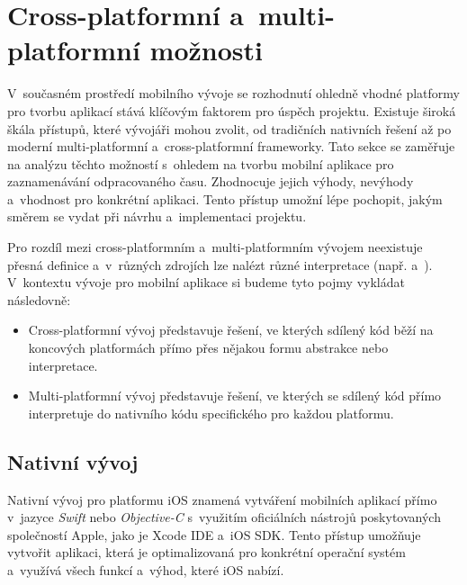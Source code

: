 \section{Cross-platformní a~multi-platformní možnosti}\label{crossplatform-multiplatform}

V~současném prostředí mobilního vývoje se rozhodnutí ohledně vhodné platformy pro tvorbu aplikací stává klíčovým faktorem pro úspěch projektu. Existuje široká škála přístupů, které vývojáři mohou zvolit, od tradičních nativních řešení až po moderní multi-platformní a~cross-platformní frameworky. Tato sekce se zaměřuje na analýzu těchto možností s~ohledem na tvorbu mobilní aplikace pro zaznamenávání odpracovaného času. Zhodnocuje jejich výhody, nevýhody a~vhodnost pro konkrétní aplikaci. Tento přístup umožní lépe pochopit, jakým směrem se vydat při návrhu a~implementaci projektu.

Pro rozdíl mezi cross-platformním a~multi-platformním vývojem neexistuje přesná definice a~v~různých zdrojích lze nalézt různé interpretace (např. \cite{cross-multiplatform-alternative-intepretation-one} a~\cite{cross-multiplatform-alternative-intepretation-two}). V~kontextu vývoje pro mobilní aplikace si budeme tyto pojmy vykládat následovně:
\begin{itemize}
\item Cross-platformní vývoj představuje řešení, ve kterých sdílený kód běží na koncových platformách přímo přes nějakou formu abstrakce nebo interpretace.
\item Multi-platformní vývoj představuje řešení, ve kterých se sdílený kód přímo interpretuje do nativního kódu specifického pro každou platformu.
\end{itemize}

\subsection{Nativní vývoj}

Nativní vývoj pro platformu iOS znamená vytváření mobilních aplikací přímo v~jazyce \emph{Swift} nebo \emph{Objective-C} s~využitím oficiálních nástrojů poskytovaných společností Apple, jako je Xcode IDE a~iOS SDK. Tento přístup umožňuje vytvořit aplikaci, která je optimalizovaná pro konkrétní operační systém a~využívá všech funkcí a~výhod, které iOS nabízí.

